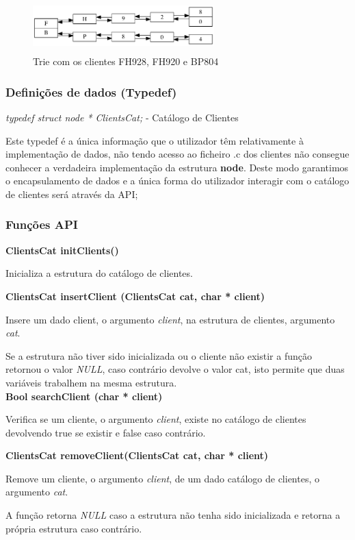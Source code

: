 \documentclass[10pt] {article}
\begin{document}
\begin{figure}[ht!]
\centering
\includegraphics[width=70mm, height=20mm]{trie.png}
\caption{Trie com os clientes FH928, FH920 e BP804}
\end{figure}

\subsubsection{Definições de dados (Typedef)}
\emph{typedef struct node * ClientsCat;} - Catálogo de Clientes
\par Este typedef é a única informação que o utilizador têm relativamente à implementação de dados, não tendo 
acesso ao ficheiro .c dos clientes não consegue conhecer a verdadeira implementação da estrutura \textbf{node}. 
Deste modo garantimos o encapsulamento de dados e a única forma do utilizador interagir com o catálogo de 
clientes será através da API;

\subsubsection{Funções API}

\noindent\textbf{ClientsCat initClients()}
\par Inicializa a estrutura do catálogo de clientes.

\noindent\textbf{ClientsCat insertClient (ClientsCat cat, char * client)}
\par Insere um dado client, o argumento \emph{client}, na estrutura de clientes, argumento \emph{cat}.
\par Se a estrutura não tiver sido inicializada ou o cliente não existir a função retornou o valor \emph{NULL},
caso contrário devolve o valor cat, isto permite que duas variáveis trabalhem na mesma estrutura. \\

\noindent \textbf {Bool searchClient (char * client)}
\par Verifica se um cliente, o argumento \emph{client}, existe no catálogo de clientes devolvendo true se existir e 
false caso contrário.

\noindent \textbf{ClientsCat removeClient(ClientsCat cat, char * client)}
\par Remove um cliente, o argumento \emph{client}, de um dado catálogo de clientes, o argumento \emph{cat}.
\par A função retorna \emph{NULL} caso a estrutura não tenha sido inicializada e
retorna a própria estrutura caso contrário. \\
\end{document}
